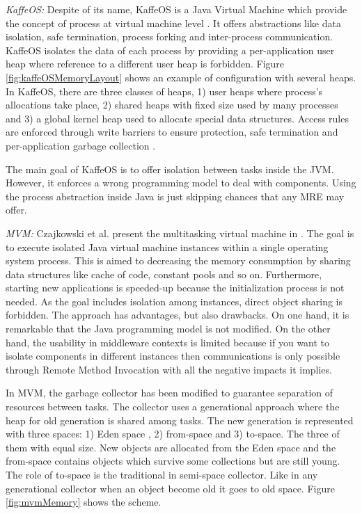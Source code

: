 \emph{KaffeOS:} Despite of its name, KaffeOS is a Java Virtual Machine which provide the concept of process at virtual machine level \cite{back_processes_2000}.
It offers abstractions like data isolation, safe termination, process forking and inter-process communication.
KaffeOS isolates the data of each process by providing a per-application user heap where reference to a different user heap is forbidden.
Figure \ref{fig:kaffeOSMemoryLayout} shows an example of configuration with several heaps.
In KaffeOS, there are three classes of heaps, 1) user heaps where process's allocations take place, 2) shared heaps with fixed size used by many processes and 3) a global kernel heap used to allocate special data structures.
Access rules are enforced through write barriers to ensure protection, safe termination and per-application garbage collection \cite{back_processes_2000}.


The main goal of KaffeOS is to offer isolation between tasks inside the JVM.
However, it enforces a wrong programming model to deal with components.
Using the process abstraction inside Java is just skipping chances that any MRE may offer.

\emph{MVM:} Czajkowski et al. present the multitasking virtual machine in \cite{czajkowski_multitasking_2001}.
The goal is to execute isolated Java virtual machine instances within a single operating system process.
This is aimed to decreasing the memory consumption by sharing data structures like cache of code, constant pools and so on.
Furthermore, starting new applications is speeded-up because the initialization process is not needed.
As the goal includes isolation among instances, direct object sharing is forbidden.
The approach has advantages, but also drawbacks.
On one hand, it is remarkable that the Java programming model is not modified.
On the other hand, the usability in middleware contexts is limited because if you want to isolate components in different instances then communications is only possible through Remote Method Invocation with all the negative impacts it implies.

In MVM, the garbage collector has been modified to guarantee separation of resources between tasks.
The collector uses a generational approach where the heap for old generation is shared among tasks.
The new generation is represented with three spaces: 1) Eden space , 2) from-space and 3) to-space.
The three of them with equal size.
New objects are allocated from the Eden space and the from-space contains objects which survive some collections but are still young.
The role of to-space is the traditional in semi-space collector. Like in any generational collector when an object become old it goes to old space.
Figure \ref{fig:mvmMemory} shows the scheme.

